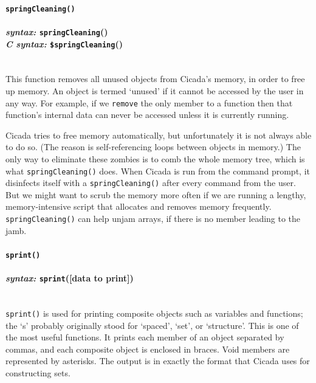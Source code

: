 \documentclass{article}
\begin{document}

\paragraph{\texttt{springCleaning()}\\\\
\normalfont \emph{syntax: } \texttt{springCleaning}()\\
\normalfont \emph{C syntax: } \texttt{\$springCleaning}()\\\\}

This function removes all unused objects from Cicada's memory, in order to free up memory.  An object is termed `unused' if it cannot be accessed by the user in any way.  For example, if we \verb#remove# the only member to a function then that function's internal data can never be accessed unless it is currently running.

Cicada tries to free memory automatically, but unfortunately it is not always able to do so.  (The reason is self-referencing loops between objects in memory.)  The only way to eliminate these zombies is to comb the whole memory tree, which is what \texttt{springCleaning()} does.  When Cicada is run from the command prompt, it disinfects itself with a \texttt{springCleaning()} after every command from the user.  But we might want to scrub the memory more often if we are running a lengthy, memory-intensive script that allocates and removes memory frequently.  \verb#springCleaning()# can help unjam arrays, if there is no member leading to the jamb.\\





\paragraph{\texttt{sprint()}\\\\
\normalfont \emph{syntax: } \texttt{sprint}([data to print])\\\\}

\texttt{sprint()} is used for printing composite objects such as variables and functions;  the `s' probably originally stood for `spaced', `set', or `structure'.  This is one of the most useful functions.  It prints each member of an object separated by commas, and each composite object is enclosed in braces.  Void members are represented by asterisks.  The output is in exactly the format that Cicada uses for constructing sets.
\end{document}
